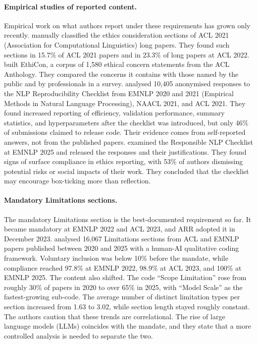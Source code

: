 \documentclass[11pt]{article}
\begin{document}
\paragraph{Empirical studies of reported content.}
Empirical work on what authors report under these requirements has grown only recently.
 manually classified the ethics consideration sections of ACL 2021 (Association for Computational Linguistics) long papers.
They found such sections in 15.7\% of ACL 2021 papers and in 23.3\% of long papers at ACL 2022.
 built EthiCon, a corpus of 1,580 ethical concern statements from the ACL Anthology.
They compared the concerns it contains with those named by the public and by professionals in a survey.
 analysed 10,405 anonymised responses to the NLP Reproducibility Checklist from EMNLP 2020 and 2021 (Empirical Methods in Natural Language Processing), NAACL 2021, and ACL 2021.
They found increased reporting of efficiency, validation performance, summary statistics, and hyperparameters after the checklist was introduced, but only 46\% of submissions claimed to release code.
Their evidence comes from self-reported answers, not from the published papers.
 examined the Responsible NLP Checklist at EMNLP 2025 and released the responses and their justifications.
They found signs of surface compliance in ethics reporting, with 53\% of authors dismissing potential risks or social impacts of their work.
They concluded that the checklist may encourage box-ticking more than reflection.

\paragraph{Mandatory Limitations sections.}
The mandatory Limitations section is the best-documented requirement so far.
It became mandatory at EMNLP 2022 and ACL 2023, and ARR adopted it in December 2023.
 analysed 16,067 Limitations sections from ACL and EMNLP papers published between 2020 and 2025 with a human-AI qualitative coding framework.
Voluntary inclusion was below 10\% before the mandate, while compliance reached 97.8\% at EMNLP 2022, 98.9\% at ACL 2023, and 100\% at EMNLP 2025.
The content also shifted.
The code ``Scope Limitation'' rose from roughly 30\% of papers in 2020 to over 65\% in 2025, with ``Model Scale'' as the fastest-growing sub-code.
The average number of distinct limitation types per section increased from 1.63 to 3.02, while section length stayed roughly constant.
The authors caution that these trends are correlational.
The rise of large language models (LLMs) coincides with the mandate, and they state that a more controlled analysis is needed to separate the two.
\end{document}
